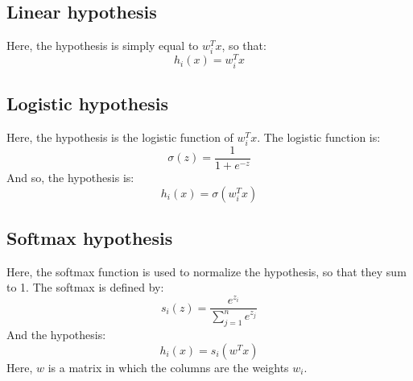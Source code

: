\documentclass[12pt, a4paper]{article}
\numberwithin{equation}{section}
\begin{document}
\subsection{Linear hypothesis}
Here, the hypothesis is simply equal to $w_i^T x$, so that:
\begin{equation}
h_i(x)=w_i^Tx
\end{equation}

\subsection{Logistic hypothesis}
Here, the hypothesis is the logistic function of $w_i^T x$. The logistic function is:
\begin{equation}
\sigma(z)=\frac{1}{1+e^{-z}}
\end{equation}
And so, the hypothesis is:
\begin{equation}
h_i(x)=\sigma(w_i^T x)
\end{equation}

\subsection{Softmax hypothesis}
Here, the softmax function is used to normalize the hypothesis, so that they sum to 1. The softmax is defined by:
\begin{equation}
s_i(z)=\frac{e^{z_i}}{\sum_{j=1}^n e^{z_j}}
\end{equation}
And the hypothesis:
\begin{equation}
h_i(x)=s_i(w^T x)
\end{equation}
Here, $w$ is a matrix in which the columns are the weights $w_i$.
\end{document}

